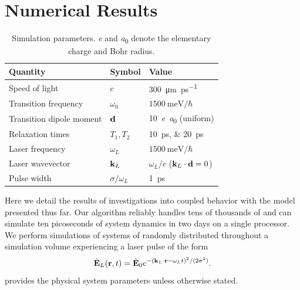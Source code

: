 \section{\label{section:results}Numerical Results}
\begin{table}
  \begin{ruledtabular}
    \begin{tabular}{lll}
      Quantity                 & Symbol            & Value                        \\ \hline
      Speed of light           & $c$               & \SI{300}{\micro\meter \per \pico\second} \\
      Transition frequency     & $\omega_0$        & $\SI{1500}{\milli\eV}/\hbar$ \\
      Transition dipole moment & $\vb{d}$          & \SI{10}{\elementarycharge\bohr} (uniform) \\
      Relaxation times         & $T_{1}, T_{2}$    & \SIlist{10;20}{\pico\second} \\
      Laser frequency          & $\omega_L$        & $\SI{1500}{\milli\eV}/\hbar$ \\
      Laser wavevector         & $\vb{k}_L$        & $\omega_L/c$ ($\vb{k}_L \cdot \vb{d} = 0$) \\
      Pulse width              & $\sigma/\omega_L$ & \SI{1}{\pico\second} \\
    \end{tabular}
  \end{ruledtabular}
  \caption{\label{table:parameters}Simulation parameters. \si{\elementarycharge} and \si{\bohr} denote the elementary charge and Bohr radius.}
\end{table}

Here we detail the results of investigations into coupled \qd{} behavior with the model presented thus far.
Our algorithm reliably handles tens of thousands of \qds{} and can simulate ten picoseconds of system dynamics in two days on a single processor.
We perform simulations of systems of \qds{} randomly distributed throughout a simulation volume experiencing a laser pulse of the form
\begin{equation}
  \tilde{\mathbf{E}}_L(\vb{r}, t) = \tilde{\mathbf{E}}_0 e^{-(\vb{k}_L \cdot \vb{r} - \omega_L t)^2/(2\sigma^2)}.
  \label{eq:pulse envelope}
\end{equation}
 provides the physical system parameters unless otherwise stated.


